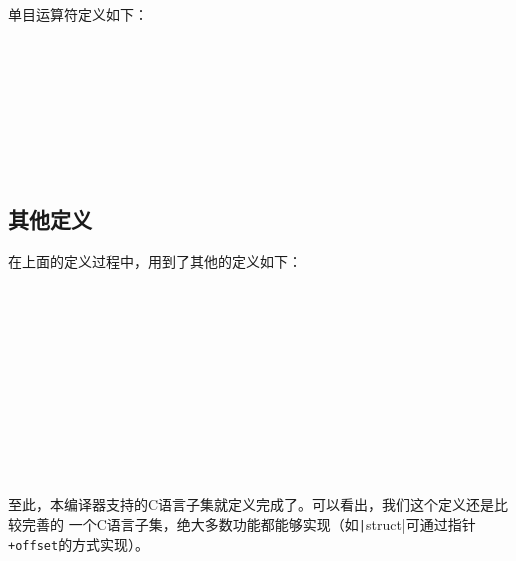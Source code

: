 单目运算符定义如下：
\begin{bnf*}
	{\bnfts{-}}\\
	\bnfmore{\bnfor\bnfts{+}}\\
	\bnfmore{\bnfor\bnfts{!}}\\
	\bnfmore{\bnfor\bnfts{\~{}}}\\
	\bnfmore{\bnfor\bnfts{++}}\\
	\bnfmore{\bnfor\bnfts{--}}\\
	\bnfmore{\bnfor\bnfts{*}}\\
	\bnfmore{\bnfor\bnfts{\&}}
\end{bnf*}

\subsection{其他定义}

在上面的定义过程中，用到了其他的定义如下：
\begin{bnf}
	{\bnfor{}}\\
	\\
	{}\\
	\\
	\\
	\\
	{\bnfsk{}\bnfor{}\bnfsk{}}\\
	{\bnfsk{}}\\
	{\bnfor{}}\\
	{\bnfor{}\bnfor{}}\\
	{\bnfsp{}\bnfsp{}}
\end{bnf}

至此，本编译器支持的C语言子集就定义完成了。可以看出，我们这个定义还是比较完善的
一个C语言子集，绝大多数功能都能够实现（如\texttt|struct|可通过指针{\tt +offset}的方式实现）。
